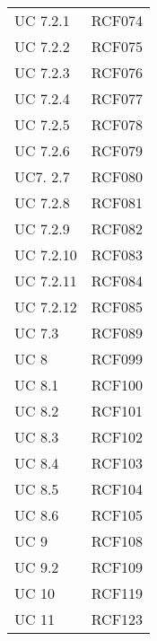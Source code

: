 \begin{longtabu} {X[c] X[c]}
   {UC 7.2.1} & RCF074 \\ 
   
   {UC 7.2.2} & RCF075 \\ 
   
   {UC 7.2.3} & RCF076 \\ 
   
   {UC 7.2.4} & RCF077 \\ 
   
   {UC 7.2.5} & RCF078 \\ 
   
   {UC 7.2.6} & RCF079 \\ 
   
   {UC7. 2.7} & RCF080 \\ 
   
   {UC 7.2.8} & RCF081 \\ 
   
   {UC 7.2.9} & RCF082 \\ 
   
   {UC 7.2.10} & RCF083 \\
   
   {UC 7.2.11} & RCF084 \\ 
   
   {UC 7.2.12} & RCF085 \\ 
 
    {UC 7.3} & RCF089 \\ 
    
    
    
   {UC 8} & RCF099 \\ 
   
   {UC 8.1} & RCF100 \\ 
   
   {UC 8.2} & RCF101 \\ 
   
   {UC 8.3} & RCF102 \\
   
   {UC 8.4} & RCF103 \\ 
   
   {UC 8.5} & RCF104 \\ 
   
   {UC 8.6} & RCF105 \\ 
   
   
   {UC 9} & RCF108 \\
   
   {UC 9.2} & RCF109 \\
   
   {UC 10} & RCF119 \\
   
   {UC 11} & RCF123 \\
   

\end{longtabu}
